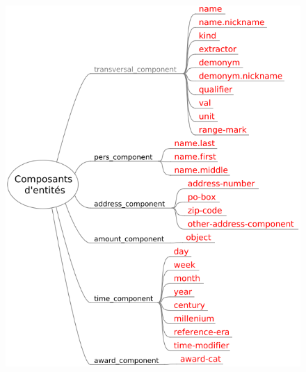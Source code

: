 \documentclass[12pt,a4paper,times,twoside,openright]{report}
\begin{document}
\begin{figure}[ht!]
\begin{minipage}{0.49\linewidth}
    \centering
    \includegraphics[scale=0.5]{images/quaero/annotation_guide-components}
\end{minipage}
\begin{minipage}{0.49\linewidth}
    \centering

\end{minipage}
\end{figure}
\end{document}
